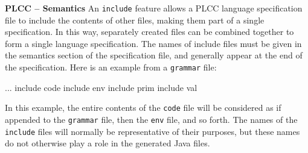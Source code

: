 \begin{minipage}[t]{\sw}
\slidenumber
\LARGE
{\bf PLCC -- Semantics}\exx
An \verb'include' feature allows a PLCC language specification file
to include the contents of other files,
making them part of a single specification.
In this way, separately created files
can be combined together to form a single language specification.
The names of include files must be given in the semantics section
of the specification file, and generally appear
at the end of the specification.
Here is an example from a \verb'grammar' file:
\begin{qv}
...
include code
include env
include prim
include val
\end{qv}
In this example, the entire contents of the \verb'code' file will be
considered as if appended to the \verb'grammar' file,
then the \verb'env' file, and so forth.
The names of the \verb'include' files
will normally be representative of their purposes,
but these names do not otherwise play a role
in the generated Java files.
\end{minipage}
\clearpage
